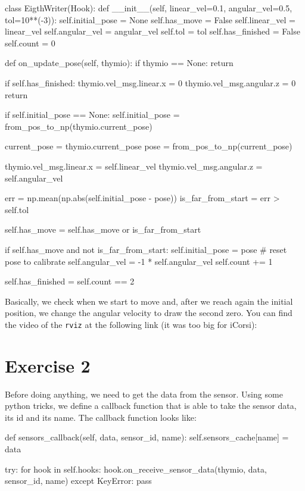 \documentclass[11pt]{article}
\begin{document}
\begin{python}
class EigthWriter(Hook):
    def __init__(self, linear_vel=0.1, angular_vel=0.5, tol=10**(-3)):
        self.initial_pose = None
        self.has_move = False
        self.linear_vel = linear_vel
        self.angular_vel = angular_vel
        self.tol = tol
        self.has_finished = False
        self.count = 0

    def on_update_pose(self, thymio):
        if thymio == None: return

        if self.has_finished: 
            thymio.vel_msg.linear.x = 0
            thymio.vel_msg.angular.z = 0
            return
        
        if self.initial_pose == None: self.initial_pose = from_pos_to_np(thymio.current_pose)

        current_pose = thymio.current_pose
        pose = from_pos_to_np(current_pose)

        thymio.vel_msg.linear.x = self.linear_vel
        thymio.vel_msg.angular.z = self.angular_vel

        err = np.mean(np.abs(self.initial_pose - pose))
        is_far_from_start = err > self.tol 

        self.has_move = self.has_move or is_far_from_start

        if self.has_move and not is_far_from_start:
            self.initial_pose = pose # reset pose to calibrate
            self.angular_vel  = -1 * self.angular_vel
            self.count += 1
        
        self.has_finished =  self.count == 2
	
\end{python}
Basically, we check when we start to move and, after we reach again the initial position, we change the angular velocity to draw the second zero. You can find the video of the \texttt{rviz} at the following link (it was too big for iCorsi):

\section{Exercise 2}
Before doing anything, we need to get the data from the sensor. Using some python tricks, we define a callback function that is able to take the sensor data, its id and its name. The callback function looks like:

\begin{python}
 def sensors_callback(self, data, sensor_id, name):
        self.sensors_cache[name] = data

        try:
            for hook in self.hooks:
                hook.on_receive_sensor_data(thymio, data, sensor_id, name)
        except KeyError:
            pass	
\end{python}
\end{document}
